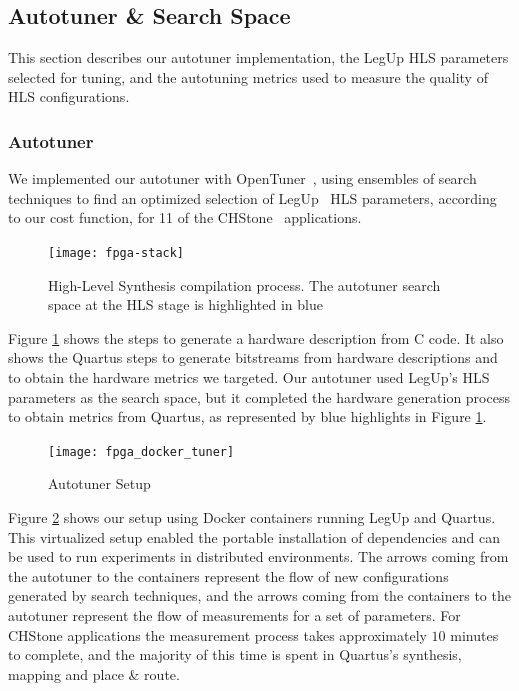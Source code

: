 \subsection{Autotuner \& Search Space}
\label{sec:FPGAautotuner}

This section describes our autotuner implementation, the LegUp HLS parameters
selected for tuning, and the autotuning metrics used to measure the quality of
HLS configurations.

\subsubsection{Autotuner}

We implemented our autotuner with OpenTuner~\cite{ansel2014opentuner}, using
ensembles of search techniques to find an optimized selection of
LegUp~\cite{canis2015legup} HLS parameters, according to our cost function, for
11 of the CHStone~\cite{hara2008chstone} applications.

\begin{figure}[htpb]
    \centering
    \texttt{[image: fpga-stack]}
    \caption{High-Level Synthesis compilation process. The autotuner search space at the HLS stage is highlighted in blue}
    \label{fig:fpga-stack}
\end{figure}

Figure \ref{fig:fpga-stack} shows the steps to generate a hardware description
from C code. It also shows the Quartus steps to generate bitstreams from
hardware descriptions and to obtain the hardware metrics we targeted. Our
autotuner used LegUp's HLS parameters as the search space, but it completed the
hardware generation process to obtain metrics from Quartus, as represented by
blue highlights in Figure \ref{fig:fpga-stack}.

\begin{figure}[htpb]
    \centering
    \texttt{[image: fpga\_docker\_tuner]}
    \caption{Autotuner Setup}
    \label{fig:autotuner}
\end{figure}

Figure \ref{fig:autotuner} shows our setup using Docker containers running
LegUp and Quartus. This virtualized setup enabled the portable installation of
dependencies and can be used to run experiments in distributed environments.
The arrows coming from the autotuner to the containers represent the flow of
new configurations generated by search techniques, and the arrows coming from
the containers to the autotuner represent the flow of measurements for a set of
parameters. For CHStone applications the measurement process takes
approximately $10$ minutes to complete, and the majority of this time is spent
in Quartus's synthesis, mapping and place \& route.

